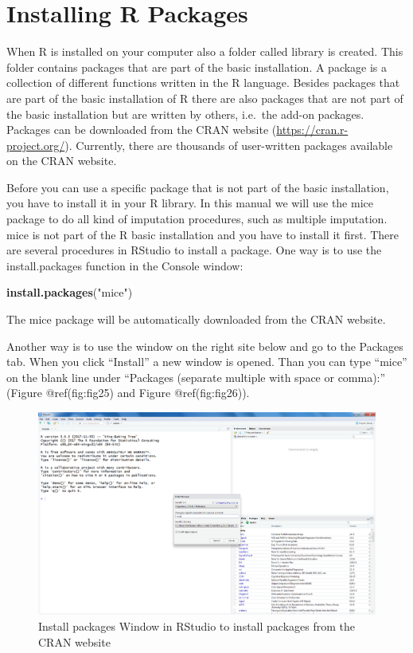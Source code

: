 \documentclass[
]{book}
\newenvironment{Shaded}{\begin{snugshade}}{\end{snugshade}}
\newcommand{\KeywordTok}[1]{\textcolor[rgb]{0.13,0.29,0.53}{\textbf{#1}}}
\newcommand{\NormalTok}[1]{#1}
\newcommand{\StringTok}[1]{\textcolor[rgb]{0.31,0.60,0.02}{#1}}
\begin{document}
\hypertarget{installing-r-packages}{%
\section{Installing R Packages}\label{installing-r-packages}}

When R is installed on your computer also a folder called library is
created. This folder contains packages that are part of the basic
installation. A package is a collection of different functions written
in the R language. Besides packages that are part of the basic
installation of R there are also packages that are not part of the basic
installation but are written by others, i.e.~the add-on packages.
Packages can be downloaded from the CRAN website
(\url{https://cran.r-project.org/}). Currently, there are thousands of
user-written packages available on the CRAN website.

Before you can use a specific package that is not part of the basic
installation, you have to install it in your R library. In this manual
we will use the mice package to do all kind of imputation procedures,
such as multiple imputation. mice is not part of the R basic
installation and you have to install it first. There are several
procedures in RStudio to install a package. One way is to use the
install.packages function in the Console window:

\begin{Shaded}
\begin{Highlighting}[]
\KeywordTok{install.packages}\NormalTok{(}\StringTok{"mice"}\NormalTok{)}
\end{Highlighting}
\end{Shaded}

The mice package will be automatically downloaded from the CRAN website.

Another way is to use the window on the right site below and go to the
Packages tab. When you click ``Install'' a new window is opened. Than
you can type ``mice'' on the blank line under ``Packages (separate
multiple with space or comma):'' (Figure @ref(fig:fig25) and Figure
@ref(fig:fig26)).

\begin{figure}

{\centering \includegraphics[width=0.95\linewidth]{images/fig1.25a} 

}

\caption{Install packages Window in RStudio to install packages from the CRAN website}\label{fig:fig25}
\end{figure}
\end{document}
